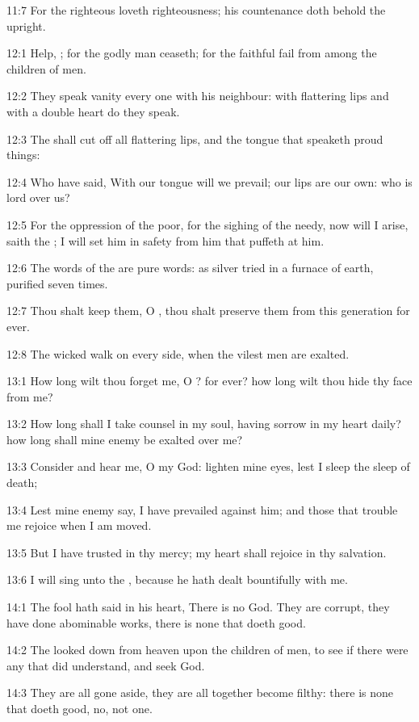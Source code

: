 11:7 For the righteous \LORD loveth righteousness; his countenance doth
behold the upright.



12:1 Help, \LORD; for the godly man ceaseth; for the faithful fail from
among the children of men.

12:2 They speak vanity every one with his neighbour: with flattering
lips and with a double heart do they speak.

12:3 The \LORD shall cut off all flattering lips, and the tongue that
speaketh proud things:

12:4 Who have said, With our tongue will we prevail; our lips are our
own: who is lord over us?

12:5 For the oppression of the poor, for the sighing of the needy, now
will I arise, saith the \LORD; I will set him in safety from him that
puffeth at him.

12:6 The words of the \LORD are pure words: as silver tried in a
furnace of earth, purified seven times.

12:7 Thou shalt keep them, O \LORD, thou shalt preserve them from this
generation for ever.

12:8 The wicked walk on every side, when the vilest men are exalted.



13:1 How long wilt thou forget me, O \LORD? for ever? how long wilt
thou hide thy face from me?

13:2 How long shall I take counsel in my soul, having sorrow in my
heart daily? how long shall mine enemy be exalted over me?

13:3 Consider and hear me, O \LORD my God: lighten mine eyes, lest I
sleep the sleep of death;

13:4 Lest mine enemy say, I have prevailed against him; and those that
trouble me rejoice when I am moved.

13:5 But I have trusted in thy mercy; my heart shall rejoice in thy
salvation.

13:6 I will sing unto the \LORD, because he hath dealt bountifully with
me.



14:1 The fool hath said in his heart, There is no God. They are
corrupt, they have done abominable works, there is none that doeth
good.

14:2 The \LORD looked down from heaven upon the children of men, to see
if there were any that did understand, and seek God.

14:3 They are all gone aside, they are all together become filthy:
there is none that doeth good, no, not one.

